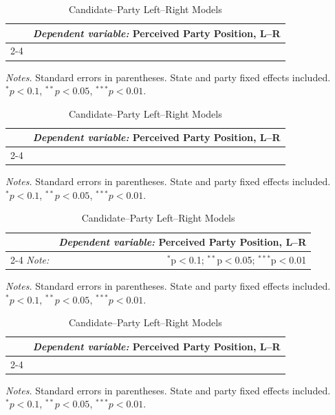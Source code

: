 \begin{table}[!htbp]\centering
\caption{Candidate--Party Left--Right Models}
\label{tab:cand_party_lr}
\begin{tabular}{lccc}
\toprule
 & \multicolumn{3}{c}{\textit{Dependent variable:} Perceived Party Position, L--R} \\
\cmidrule(lr){2-4}
\hline \bottomrule
\end{tabular}
\vspace{0.2em}
{\footnotesize \textit{Notes.} Standard errors in parentheses. State and party fixed effects included. \\$^{*}p<0.1$, $^{**}p<0.05$, $^{***}p<0.01$.}
\end{table}

\begin{table}[!htbp]\centering
\caption{Candidate--Party Left--Right Models}
\label{tab:cand_party_lr}
\begin{tabular}{lccc}
\toprule
 & \multicolumn{3}{c}{\textit{Dependent variable:} Perceived Party Position, L--R} \\
\cmidrule(lr){2-4}
\hline \\[-1.8ex] \bottomrule
\end{tabular}
\vspace{0.2em}
{\footnotesize \textit{Notes.} Standard errors in parentheses. State and party fixed effects included. \\$^{*}p<0.1$, $^{**}p<0.05$, $^{***}p<0.01$.}
\end{table}

\begin{table}[!htbp]\centering
\caption{Candidate--Party Left--Right Models}
\label{tab:cand_party_lr}
\begin{tabular}{lccc}
\toprule
 & \multicolumn{3}{c}{\textit{Dependent variable:} Perceived Party Position, L--R} \\
\cmidrule(lr){2-4}
\textit{Note:}  & \multicolumn{3}{r}{$^{*}$p$<$0.1; $^{**}$p$<$0.05; $^{***}$p$<$0.01} \\ \bottomrule
\end{tabular}
\vspace{0.2em}
{\footnotesize \textit{Notes.} Standard errors in parentheses. State and party fixed effects included. \\$^{*}p<0.1$, $^{**}p<0.05$, $^{***}p<0.01$.}
\end{table}

\begin{table}[!htbp]\centering
\caption{Candidate--Party Left--Right Models}
\label{tab:cand_party_lr}
\begin{tabular}{lccc}
\toprule
 & \multicolumn{3}{c}{\textit{Dependent variable:} Perceived Party Position, L--R} \\
\cmidrule(lr){2-4}
\bottomrule
\end{tabular}
\vspace{0.2em}
{\footnotesize \textit{Notes.} Standard errors in parentheses. State and party fixed effects included. \\$^{*}p<0.1$, $^{**}p<0.05$, $^{***}p<0.01$.}
\end{table}

